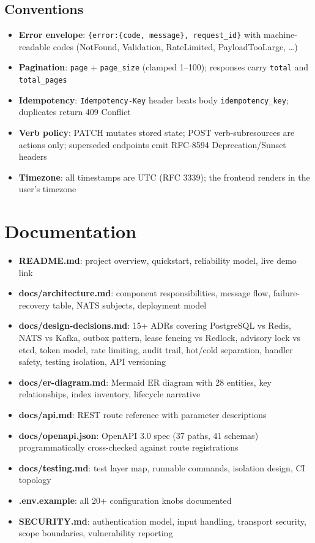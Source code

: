 \documentclass[11pt,a4paper]{article}
\begin{document}
\subsection{Conventions}

\begin{itemize}[nosep]
\item \textbf{Error envelope}: \texttt{\{error:\{code, message\},
request\_id\}} with machine-readable codes (NotFound, Validation,
RateLimited, PayloadTooLarge, …)
\item \textbf{Pagination}: \texttt{page} + \texttt{page\_size} (clamped
1–100); responses carry \texttt{total} and \texttt{total\_pages}
\item \textbf{Idempotency}: \texttt{Idempotency-Key} header beats body
\texttt{idempotency\_key}; duplicates return 409 Conflict
\item \textbf{Verb policy}: PATCH mutates stored state; POST verb-subresources
are actions only; superseded endpoints emit RFC-8594 Deprecation/Sunset headers
\item \textbf{Timezone}: all timestamps are UTC (RFC 3339); the frontend
renders in the user's timezone
\end{itemize}

\section{Documentation}

\begin{itemize}[nosep]
\item \textbf{README.md}: project overview, quickstart, reliability model,
live demo link
\item \textbf{docs/architecture.md}: component responsibilities, message
flow, failure-recovery table, NATS subjects, deployment model
\item \textbf{docs/design-decisions.md}: 15+ ADRs covering PostgreSQL vs
Redis, NATS vs Kafka, outbox pattern, lease fencing vs Redlock, advisory lock
vs etcd, token model, rate limiting, audit trail, hot/cold separation, handler
safety, testing isolation, API versioning
\item \textbf{docs/er-diagram.md}: Mermaid ER diagram with 28 entities, key
relationships, index inventory, lifecycle narrative
\item \textbf{docs/api.md}: REST route reference with parameter descriptions
\item \textbf{docs/openapi.json}: OpenAPI 3.0 spec (37 paths, 41 schemas)
programmatically cross-checked against route registrations
\item \textbf{docs/testing.md}: test layer map, runnable commands, isolation
design, CI topology
\item \textbf{.env.example}: all 20+ configuration knobs documented
\item \textbf{SECURITY.md}: authentication model, input handling, transport
security, scope boundaries, vulnerability reporting
\end{itemize}
\end{document}
